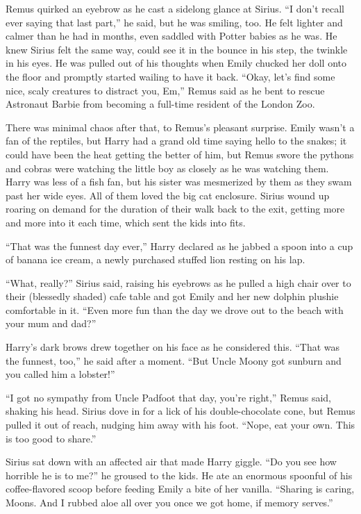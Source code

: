 Remus quirked an eyebrow as he cast a sidelong glance at Sirius. “I don’t recall ever saying that last part,” he said, but he was smiling, too. He felt lighter and calmer than he had in months, even saddled with Potter babies as he was. He knew Sirius felt the same way, could see it in the bounce in his step, the twinkle in his eyes. He was pulled out of his thoughts when Emily chucked her doll onto the floor and promptly started wailing to have it back. “Okay, let’s find some nice, scaly creatures to distract you, Em,” Remus said as he bent to rescue Astronaut Barbie from becoming a full-time resident of the London Zoo.

There was minimal chaos after that, to Remus’s pleasant surprise. Emily wasn’t a fan of the reptiles, but Harry had a grand old time saying hello to the snakes; it could have been the heat getting the better of him, but Remus swore the pythons and cobras were watching the little boy as closely as he was watching them. Harry was less of a fish fan, but his sister was mesmerized by them as they swam past her wide eyes. All of them loved the big cat enclosure. Sirius wound up roaring on demand for the duration of their walk back to the exit, getting more and more into it each time, which sent the kids into fits.

“That was the funnest day ever,” Harry declared as he jabbed a spoon into a cup of banana ice cream, a newly purchased stuffed lion resting on his lap.

“What, really?” Sirius said, raising his eyebrows as he pulled a high chair over to their (blessedly shaded) cafe table and got Emily and her new dolphin plushie comfortable in it. “Even more fun than the day we drove out to the beach with your mum and dad?”

Harry’s dark brows drew together on his face as he considered this. “That was the funnest, too,” he said after a moment. “But Uncle Moony got sunburn and you called him a lobster!”

“I got no sympathy from Uncle Padfoot that day, you’re right,” Remus said, shaking his head. Sirius dove in for a lick of his double-chocolate cone, but Remus pulled it out of reach, nudging him away with his foot. “Nope, eat your own. This is too good to share.”

Sirius sat down with an affected air that made Harry giggle. “Do you see how horrible he is to me?” he groused to the kids. He ate an enormous spoonful of his coffee-flavored scoop before feeding Emily a bite of her vanilla. “Sharing is caring, Moons. And I rubbed aloe all over you once we got home, if memory serves.”

